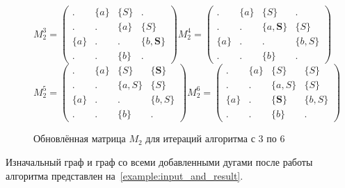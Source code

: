 \begin{figure}[ht]
    \centering
    $$
    M_2^3 =
    \begin{pmatrix}
    .     & \{a\} & \{S\} & .       \\
    .     & .     & \{a\} & \{S\}   \\
    \{a\} & .     & .     & \{b, \textbf{S}\} \\
    .     & .     & \{b\} & .
    \end{pmatrix}
    M_2^4 =
    \begin{pmatrix}
    .     & \{a\} & \{S\}   & .       \\
    .     & .     & \{a, \textbf{S}\} & \{S\}   \\
    \{a\} & .     & .       & \{b, S\} \\
    .     & .     & \{b\}   & .
    \end{pmatrix}
    $$
    $$
    M_2^5 =
    \begin{pmatrix}
    .     & \{a\} & \{S\}   & \{\textbf{S}\}   \\
    .     & .     & \{a, S\} & \{S\}   \\
    \{a\} & .     & .       & \{b, S\} \\
    .     & .     & \{b\}   & .
    \end{pmatrix}
    M_2^6 =
    \begin{pmatrix}
    .     & \{a\} & \{S\}   & \{S\}   \\
    .     & .     & \{a, S\} & \{S\}   \\
    \{a\} & .     & \{\textbf{S}\}   & \{b, S\} \\
    .     & .     & \{b\}   & .
    \end{pmatrix}
    $$
    \caption{Обновлённая матрица $M_2$ для итераций алгоритма с 3 по 6}
    \label{example:iteration3to6res}
\end{figure}



Изначальный граф и граф со всеми добавленными дугами после работы алгоритма представлен на~\cref{example:input_and_result}.

